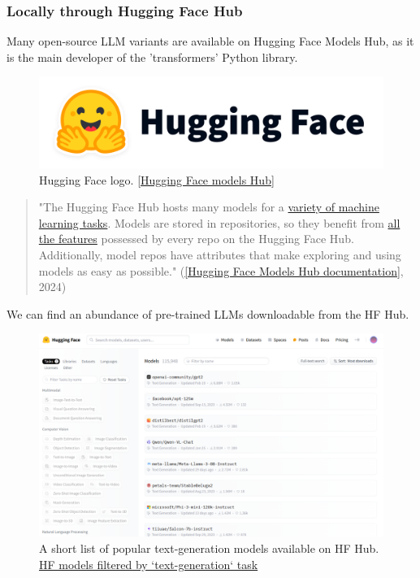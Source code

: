 \subsubsection*{Locally through Hugging Face Hub}
Many open-source LLM variants are available on Hugging Face Models Hub, as it is the main developer of the 'transformers' Python library.
\begin{figure}[htbp]
    \centering
    \includegraphics[width=0.4\linewidth]{./figures/hf-logo.png}
    \caption{Hugging Face logo. \href{https://huggingface.co/models}{[Hugging Face models Hub]}}
\end{figure}
\begin{quote}
    "The Hugging Face Hub hosts many models for a \href{https://huggingface.co/tasks}{variety of machine learning tasks}. Models are stored in repositories, so they benefit from \href{https://huggingface.co/docs/hub/repositories}{all the features} possessed by every repo on the Hugging Face Hub. Additionally, model repos have attributes that make exploring and using models as easy as possible."  (\href{https://huggingface.co/docs/hub/models}{[Hugging Face Models Hub documentation]}, 2024)
\end{quote}
We can find an abundance of pre-trained LLMs downloadable from the HF Hub.
\begin{figure}[htbp]
    \centering
    \includegraphics[width=.85\linewidth]{./figures/hf-tg-models.png}
    \caption{A short list of popular text-generation models available on HF Hub. \href{https://huggingface.co/models?pipeline_tag=text-generation&sort=downloads}{HF models filtered by `text-generation` task}}
\end{figure}\newline
